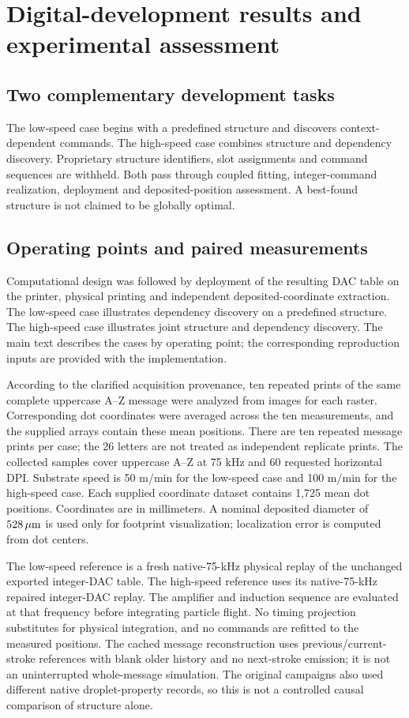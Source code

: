 \section{Digital-development results and experimental assessment}
\label{sec:results}
\label{sec:deposited_assessment}
\subsection{Two complementary development tasks}
The low-speed case begins with a predefined structure and discovers context-dependent commands. The high-speed case combines structure and dependency discovery. Proprietary structure identifiers, slot assignments and command sequences are withheld. Both pass through coupled fitting, integer-command realization, deployment and deposited-position assessment. A best-found structure is not claimed to be globally optimal.



\subsection{Operating points and paired measurements}
Computational design was followed by deployment of the resulting DAC table on the printer, physical printing and independent deposited-coordinate extraction. The low-speed case illustrates dependency discovery on a predefined structure. The high-speed case illustrates joint structure and dependency discovery. The main text describes the cases by operating point; the corresponding reproduction inputs are provided with the implementation.

According to the clarified acquisition provenance, ten repeated prints of the same complete uppercase A--Z message were analyzed from images for each raster. Corresponding dot coordinates were averaged across the ten measurements, and the supplied arrays contain these mean positions. There are ten repeated message prints per case; the 26 letters are not treated as independent replicate prints. The collected samples cover uppercase A--Z at 75 kHz and 60 requested horizontal DPI. Substrate speed is 50 m/min for the low-speed case and 100 m/min for the high-speed case. Each supplied coordinate dataset contains 1,725 mean dot positions. Coordinates are in millimeters. A nominal deposited diameter of $528\,\mu\mathrm{m}$ is used only for footprint visualization; localization error is computed from dot centers.

The low-speed reference is a fresh native-75-kHz physical replay of the unchanged exported integer-DAC table. The high-speed reference uses its native-75-kHz repaired integer-DAC replay. The amplifier and induction sequence are evaluated at that frequency before integrating particle flight. No timing projection substitutes for physical integration, and no commands are refitted to the measured positions. The cached message reconstruction uses previous/current-stroke references with blank older history and no next-stroke emission; it is not an uninterrupted whole-message simulation. The original campaigns also used different native droplet-property records, so this is not a controlled causal comparison of structure alone.

